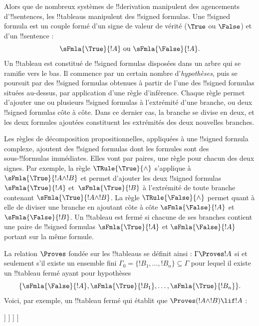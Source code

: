 \documentclass[../../../include/open-logic-section]{subfiles}
\begin{document}
      {}
      {}


Alors que de nombreux systèmes de !!{derivation} manipulent des
agencements d'!!{sentence}s, les !!{tableau}s manipulent des
!!{signed formula}s. Une !!{signed formula} est un couple formé d'un
signe de valeur de vérité ($\True$ ou $\False$) et d'un !!{sentence} :
\[
\sFmla{\True}{!A} \text{ ou } \sFmla{\False}{!A}.
\]
Un !!{tableau} est constitué de !!{signed formula}s disposées dans un
arbre qui se ramifie vers le bas. Il commence par un certain nombre
d'\emph{hypothèses}, puis se poursuit par des !!{signed formula}s
obtenues à partir de l'une des !!{signed formula}s situées au-dessus,
par application d'une règle d'inférence. Chaque règle permet d'ajouter
une ou plusieurs !!{signed formula}s à l'extrémité d'une branche,
ou deux !!{signed formula}s côte à côte. Dans ce dernier cas, la branche
se divise en deux, et les deux formules ajoutées constituent les
extrémités des deux nouvelles branches.

Les règles de décomposition propositionnelles, appliquées à une
!!{signed formula} complexe, ajoutent des !!{signed formula}s dont les
formules sont des sous-!!{formula}s immédiates. Elles vont par paires,
une règle pour chacun des deux signes. Par exemple, la règle
$\TRule{\True}{\land}$ s'applique à $\sFmla{\True}{!A \land !B}$ et
permet d'ajouter les deux !!{signed formula}s $\sFmla{\True}{!A}$
et~$\sFmla{\True}{!B}$ à l'extrémité de toute branche contenant
$\sFmla{\True}{!A \land !B}$. La règle $\TRule{\False}{\land}$
permet quant à elle de diviser une branche en ajoutant côte à côte
$\sFmla{\False}{!A}$ et $\sFmla{\False}{!B}$.
Un !!{tableau} est fermé si chacune de ses branches contient une paire
de !!{signed formula}s $\sFmla{\True}{!A}$ et $\sFmla{\False}{!A}$
portant sur la même formule.
%
%
%
%
%
%
%
%
%

La relation $\Proves$ fondée sur les !!{tableau}s se définit ainsi :
$\Gamma \Proves !A$ si et seulement s'il existe un ensemble fini
$\Gamma_0 = \{!B_1, \dots, !B_n\} \subseteq \Gamma$ pour lequel il
existe un !!{tableau} fermé ayant pour hypothèses
\[
\{\sFmla{\False}{!A}, \sFmla{\True}{!B_1}, \dots, \sFmla{\True}{!B_n}\}.
\]
Voici, par exemple, un !!{tableau} fermé qui établit que
$\Proves (!A \land !B) \lif !A$ :
\begin{oltableau}
  [\sFmla{\False}{(\formula{A} \land \formula{B}) \lif \formula{A}}, just = \TAss
    [\sFmla{\True}{\formula{A} \land \formula{B}}, just = {\TRule{\False}{\lif}[1]}
      [\sFmla{\False}{\formula{A}}, just = {\TRule{\False}{\lif}[1]}
        [\sFmla{\True}{\formula{A}}, just = {\TRule{\True}{\land}[2]}
          [\sFmla{\True}{\formula{B}}, just = {\TRule{\True}{\land}[2]}, close]
        ]
      ]
    ]
  ]
\end{oltableau}
\end{document}
